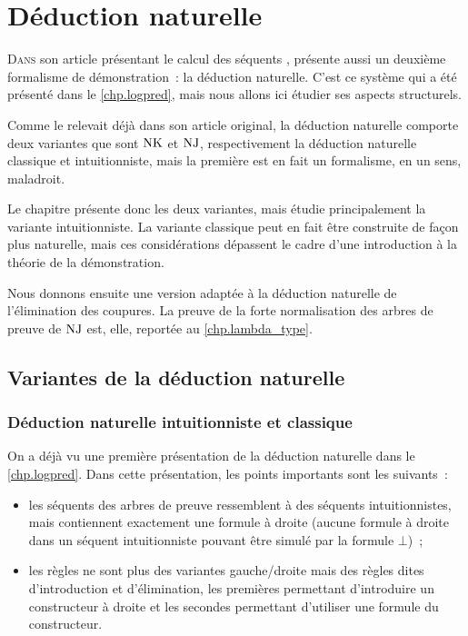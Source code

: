 \chapter{Déduction naturelle}
\label{chp.deduc.nat}

\minitoc

\lettrine{D}{ans} son article présentant le calcul des séquents
\cite{Gentzen1934I},  présente aussi un deuxième formalisme de
démonstration~: la déduction naturelle. C'est ce système qui a été présenté dans
le \cref{chp.logpred}, mais nous allons ici étudier ses aspects structurels.

Comme le relevait déjà  dans son article original, la déduction
naturelle comporte deux variantes que sont $\operatorname{NK}$ et $\operatorname{NJ}$, respectivement la
déduction naturelle classique et intuitionniste, mais la première est en fait un
formalisme, en un sens, maladroit.

Le chapitre présente donc les deux variantes, mais étudie principalement la
variante intuitionniste. La variante classique peut en fait être construite de
façon plus naturelle, mais ces considérations dépassent le cadre d'une
introduction à la théorie de la démonstration.

Nous donnons ensuite une version adaptée à la déduction naturelle de
l'élimination des coupures. La preuve de la forte normalisation des
arbres de preuve de $\operatorname{NJ}$ est, elle, reportée au \cref{chp.lambda_type}.

\section{Variantes de la déduction naturelle}

\subsection{Déduction naturelle intuitionniste et classique}

On a déjà vu une première présentation de la déduction naturelle dans le
\cref{chp.logpred}. Dans cette présentation, les points importants sont les
suivants~:
\begin{itemize}
\item les séquents des arbres de preuve ressemblent à des séquents
  intuitionnistes, mais contiennent exactement une formule à droite (aucune
  formule à droite dans un séquent intuitionniste pouvant être simulé par la
  formule $\bot$)~;
\item les règles ne sont plus des variantes gauche/droite mais des règles dites
  d'introduction et d'élimination, les premières permettant d'introduire un
  constructeur à droite et les secondes permettant d'utiliser une formule du
  constructeur.
\end{itemize}

